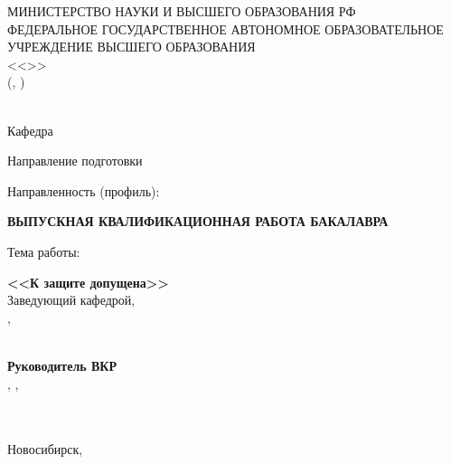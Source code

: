 \begin{titlepage}
\newpage
\setlength{\baselineskip}{5mm}

\begin{center}
	МИНИСТЕРСТВО НАУКИ И ВЫСШЕГО ОБРАЗОВАНИЯ РФ \\
	ФЕДЕРАЛЬНОЕ ГОСУДАРСТВЕННОЕ АВТОНОМНОЕ ОБРАЗОВАТЕЛЬНОЕ УЧРЕЖДЕНИЕ ВЫСШЕГО ОБРАЗОВАНИЯ \\
	\hspace{-0.5mm}<<\MakeUppercase{\universitylongsplit}>> \\
	(\MakeUppercase{\university}, \universityshort)
\end{center}

\begin{center}
    \faculty \\
    Кафедра \uline{\makebox[6cm][l]{\department}}
\end{center}

Направление подготовки \programnum\thinspace{\programname}

Направленность (профиль): \thinspace{\specialization}
\vspace{1.53cm} %

\begin{center}
    \hspace{7mm}\textbf{ВЫПУСКНАЯ КВАЛИФИКАЦИОННАЯ РАБОТА БАКАЛАВРА} \\
    \textbf{\student}
\end{center}

Тема работы:

\begin{center}
    \MakeUppercase{\textbf{\topic}}
    \vspace{1.02cm} %
\end{center}


\begin{minipage}[b]{0.35\textwidth}
    \textbf{<<К защите допущена>>} \\
    Заведующий кафедрой, \\
    \apdegree, \aprank \\
    \infotemplate \\
    \datetemplate
\end{minipage}
\hspace{20mm}
\begin{minipage}[b]{0.35\textwidth}
    \textbf{Руководитель ВКР} \\
    \sadegree, \sarank, \\
    \sansutitle \\
    \infotemplate \\
    \datetemplate
\end{minipage}

\begin{center}  
    \vfill
    Новосибирск, \currentyear[\uline]
\end{center}

\end{titlepage}